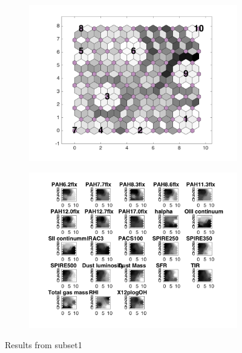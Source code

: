 \begin{figure}
    \begin{subfigure}[b]{0.5\textwidth}
        \centering
        \includegraphics[width=\textwidth]{../../images0.01/M31/2D/image_subsets/subset1_dist_with_hits_t.png}
        \label{fig: subset1_dist}
    \end{subfigure}
    \hfill
    \begin{subfigure}[b]{0.5\textwidth}
        \includegraphics[width=\textwidth]{../../images0.01/M31/2D/image_subsets/weight_planes_subset1.png}
        \label{fig: subset1_plane}
    \end{subfigure}
    \caption{Results from subset1}
    \label{fig: subset1}
\end{figure}